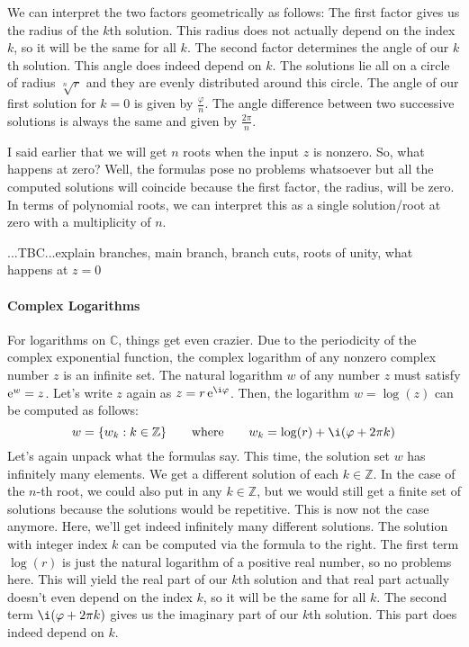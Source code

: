 \medskip
We can interpret the two factors geometrically as follows: The first factor gives us the radius of the $k$th solution. This radius does not actually depend on the index $k$, so it will be the same for all $k$. The second factor determines the angle of our $k$th solution. This angle does indeed depend on $k$. The solutions lie all on a circle of radius $\sqrt[n]{r}$ and they are evenly distributed around this circle. The angle of our first solution for $k=0$ is given by $\frac{\varphi}{n}$. The angle difference between two successive solutions is always the same and given by $\frac{2 \pi}{n}$. 

\medskip
I said earlier that we will get $n$ roots when the input $z$ is nonzero. So, what happens at zero? Well, the formulas pose no problems whatsoever but all the computed solutions will coincide because the first factor, the radius, will be zero. In terms of polynomial roots, we can interpret this as a single solution/root at zero with a multiplicity of $n$.


 ...TBC...explain branches, main branch, branch cuts, roots of unity, what happens at $z=0$



\paragraph{Complex Logarithms}
For logarithms on $\mathbb{C}$, things get even crazier. Due to the periodicity of the complex exponential function, the complex logarithm of any nonzero complex number $z$ is an infinite set. The natural logarithm $w$ of any number $z$ must satisfy $\operatorname{\mathrm{e}}^w = z$. Let's write $z$ again as $z = r \e^{\i \varphi}$. Then, the logarithm $w = \log(z)$ can be computed as follows:
\begin{equation}
 \label{Eq:ComplexLogarithm}
 w = \{ w_k : k \in \mathbb{Z}  \}
 \qquad \text{where} \qquad
 w_k = \log(r) + \i (\varphi + 2 \pi k)
\end{equation}
Let's again unpack what the formulas say. This time, the solution set $w$ has infinitely many elements. We get a different solution of each $k \in \mathbb{Z}$. In the case of the $n$-th root, we could also put in any $k \in \mathbb{Z}$, but we would still get a finite set of solutions because the solutions would be repetitive. This is now not the case anymore. Here, we'll get indeed infinitely many different solutions. The solution with integer index $k$ can be computed via the formula to the right. The first term $\log(r)$ is just the natural logarithm of a positive real number, so no problems here. This will yield the real part of our $k$th solution and that real part actually doesn't even depend on the index $k$, so it will be the same for all $k$. The second term $\i (\varphi + 2 \pi k)$ gives us the imaginary part of our $k$th solution. This part does indeed depend on $k$. 

